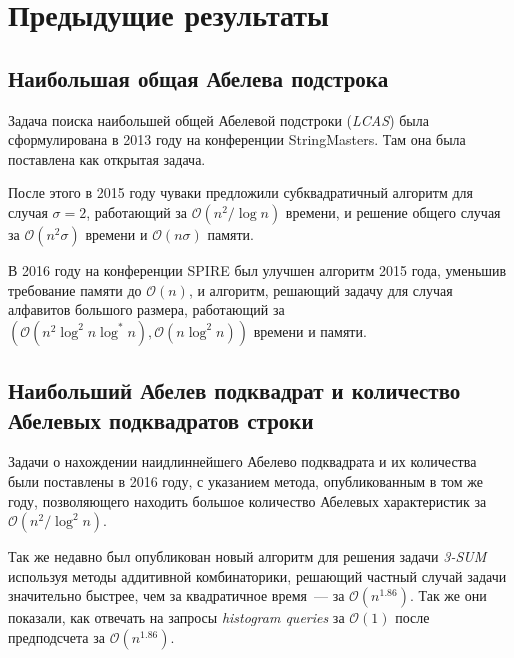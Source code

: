 \section{Предыдущие результаты}
\subsection{Наибольшая общая Абелева подстрока}
Задача поиска наибольшей общей Абелевой подстроки (\textit{LCAS}) была сформулирована в 2013 году на конференции StringMasters. Там она была поставлена как открытая задача.

После этого в 2015 году чуваки предложили субквадратичный алгоритм для случая $\sigma=2$, работающий за $\mathcal{O}(n^2/\log n)$ времени, и решение общего случая за $\mathcal{O}(n^2\sigma)$ времени и $\mathcal{O}(n\sigma)$ памяти.

В 2016 году на конференции SPIRE \cite{1} был улучшен алгоритм 2015 года, уменьшив требование памяти до $\mathcal{O}(n)$, и алгоритм, решающий задачу для случая алфавитов большого размера, работающий за $(\mathcal{O}(n^2 \log^2 n \log^* n), \mathcal{O}(n \log^2 n))$ времени и памяти. %

\subsection{Наибольший Абелев подквадрат и количество Абелевых подквадратов строки}
Задачи о нахождении наидлиннейшего Абелево подквадрата и их количества были поставлены в 2016 году, с указанием метода, опубликованным в том же году, позволяющего находить большое количество Абелевых характеристик за $\mathcal{O}(n^2 / \log^2 n)$.

Так же недавно был опубликован новый алгоритм для решения задачи \textit{3-SUM} используя методы аддитивной комбинаторики, решающий частный случай задачи значительно быстрее, чем за квадратичное время~--- за $\mathcal{O}(n^{1.86})$. Так же они показали, как отвечать на запросы \textit{histogram queries} за $\mathcal{O}(1)$ после предподсчета за $\mathcal{O}(n^{1.86})$.